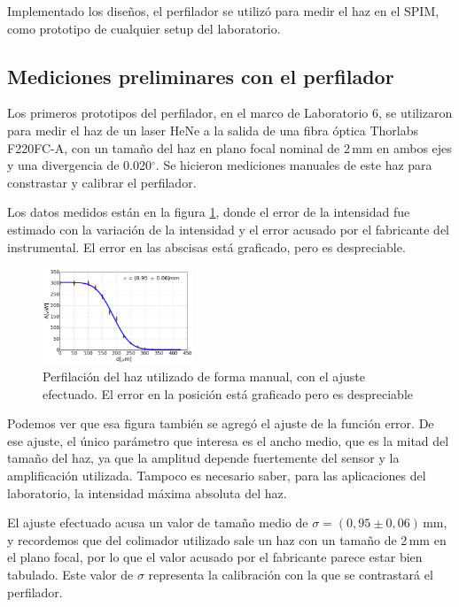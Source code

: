 Implementado los diseños, el perfilador se utilizó para medir el haz en el SPIM, como prototipo de cualquier setup del laboratorio.

\subsection{Mediciones preliminares con el perfilador}
Los primeros prototipos del perfilador, en el marco de Laboratorio 6, se utilizaron para medir el haz de un laser HeNe a la salida de una fibra óptica Thorlabs F220FC-A\cite{thorlabs_fc}, con un tamaño del haz en plano focal nominal de 2$\,$mm en ambos ejes y una divergencia de 0.020$^\circ$. Se hicieron mediciones manuales de este haz para constrastar y calibrar el perfilador.

Los datos medidos están en la figura \ref{fig:perfilador/calibracion_preliminar}, donde el error de la intensidad fue estimado con la variación de la intensidad y el error acusado por el fabricante del instrumental. El error en las abscisas está graficado, pero es despreciable.

\begin{figure}[H]
    \centering
    \includegraphics[width=0.4\textwidth]{fig/perfilador/calibracion_preliminar}
    \caption{Perfilación del haz utilizado de forma manual, con el ajuste efectuado. El error en la posición está graficado pero es despreciable}
    \label{fig:perfilador/calibracion_preliminar}
\end{figure}

Podemos ver que esa figura también se agregó el ajuste de la función error. De ese ajuste, el único parámetro que interesa es el ancho medio, que es la mitad del tamaño del haz, ya que la amplitud depende fuertemente del sensor y la amplificación utilizada. Tampoco es necesario saber, para las aplicaciones del laboratorio, la intensidad máxima absoluta del haz.

El ajuste efectuado acusa un valor de tamaño medio de $\sigma = (0,95\pm0,06)\,$mm, y recordemos que del colimador utilizado sale un haz con un tamaño de 2$\,$mm en el plano focal, por lo que el valor acusado por el fabricante parece estar bien tabulado. Este valor de $\sigma$ representa la calibración con la que se contrastará el perfilador.

